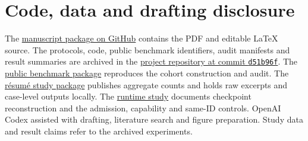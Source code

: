 \documentclass[11pt,a4paper]{article}
\newcommand{\code}[1]{\texttt{#1}}
\begin{document}
\section*{Code, data and drafting disclosure}

The \href{https://github.com/adelmansourjr/racial-bias-ai-calibration/tree/main/nameguard-paper}{manuscript package on GitHub} contains the PDF and editable LaTeX source. The protocols, code, public benchmark identifiers, audit manifests and result summaries are archived in the \href{https://github.com/adelmansourjr/racial-bias-ai-calibration/tree/d51b96f96982bc41a42b368af6d38d459b2a95d5}{project repository at commit \code{d51b96f}}. The \href{https://github.com/adelmansourjr/racial-bias-ai-calibration/tree/main/nameguard-risk-study}{public benchmark package} reproduces the cohort construction and audit. The \href{https://github.com/adelmansourjr/racial-bias-ai-calibration/tree/main/nameguard-real-evidence}{résumé study package} publishes aggregate counts and holds raw excerpts and case-level outputs locally. The \href{https://github.com/adelmansourjr/racial-bias-ai-calibration/tree/main/nameguard-peer-review}{runtime study} documents checkpoint reconstruction and the admission, capability and same-ID controls. OpenAI Codex assisted with drafting, literature search and figure preparation. Study data and result claims refer to the archived experiments.

\clearpage


\clearpage
\renewcommand{\bibfont}{\small}
\setlength{\bibsep}{3.8pt}
\providecommand{\doi}[1]{\href{https://doi.org/#1}{\nolinkurl{#1}}}

{}

\end{document}
